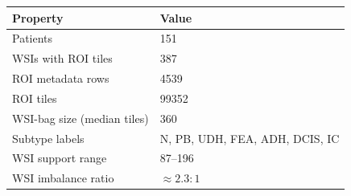 \begin{tabular}{ll}
\toprule
Property & Value\\
\midrule
Patients & \num{151}\\
WSIs with ROI tiles & \num{387}\\
ROI metadata rows & \num{4539}\\
ROI tiles & \num{99352}\\
WSI-bag size (median tiles) & \num{360}\\
Subtype labels & N, PB, UDH, FEA, ADH, DCIS, IC\\
WSI support range & \num{87}--\num{196}\\
WSI imbalance ratio & ${\approx}\num{2.3}{:}1$\\
\bottomrule
\end{tabular}
